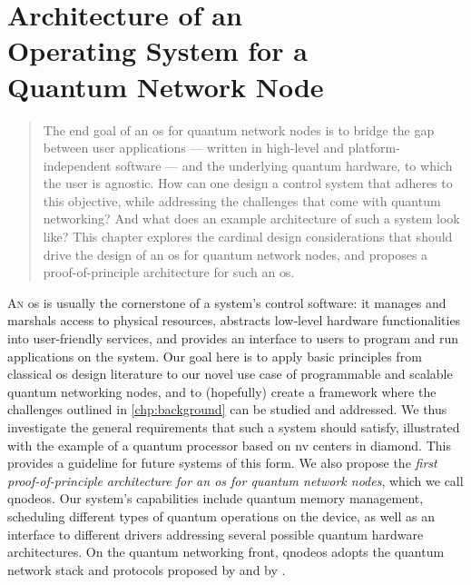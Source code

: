 \chapter
 [Architecture of an Operating System for a Quantum Network Node]
 {Architecture of an\\Operating System for a\\Quantum Network Node}
\label{chp:arch}

\begin{abstract}
The end goal of an \acrfull{os} for quantum network nodes is to bridge the gap between user
applications --- written in high-level and platform-independent software --- and the underlying
quantum hardware, to which the user is agnostic. How can one design a control system that adheres to
this objective, while addressing the challenges that come with quantum networking? And what does an
example architecture of such a system look like? This chapter explores the cardinal design
considerations that should drive the design of an \acrshort{os} for quantum network nodes, and
proposes a proof-of-principle architecture for such an \acrshort{os}.
\end{abstract}


\newpage

\lettrine{A}{n} \acrfull{os} is usually the cornerstone of a system's control software: it manages
and marshals access to physical resources, abstracts low-level hardware functionalities into
user-friendly services, and provides an interface to users to program and run applications on the
system. Our goal here is to apply basic principles from classical \acrshort{os} design literature to
our novel use case of programmable and scalable quantum networking nodes, and to (hopefully) create
a framework where the challenges outlined in \cref{chp:background} can be studied and addressed. We
thus investigate the general requirements that such a system should satisfy, illustrated with the
example of a quantum processor based on \acrfull{nv} centers in diamond. This provides a guideline
for future systems of this form. We also propose the \emph{first proof-of-principle architecture for
an \acrlong{os} for quantum network nodes}, which we call \acrshort{qnodeos}. Our system's
capabilities include quantum memory management, scheduling different types of quantum operations on
the device, as well as an interface to different drivers addressing several possible quantum
hardware architectures. On the quantum networking front, \acrshort{qnodeos} adopts the quantum
network stack and protocols proposed by \textcite{dahlberg_2019_egp} and by
\textcite{kozlowski_2020_qnp}.

